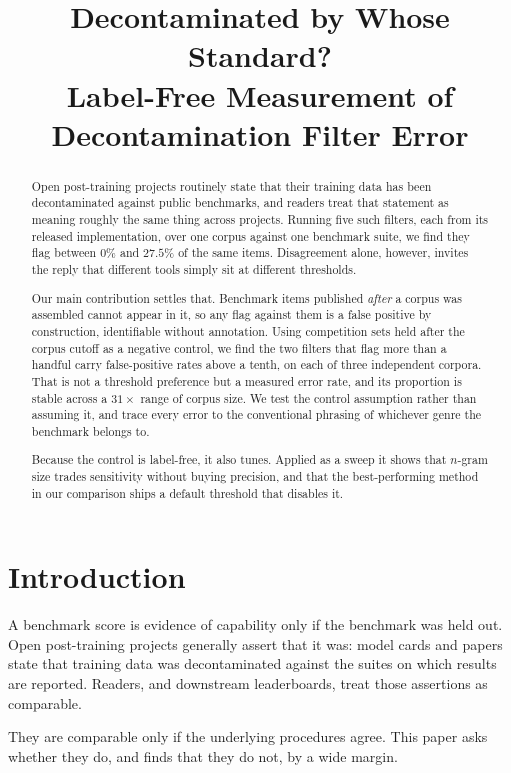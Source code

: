 \documentclass[11pt]{article}
\title{Decontaminated by Whose Standard?\\
Label-Free Measurement of Decontamination Filter Error}
\begin{document}
\maketitle

\begin{abstract}
Open post-training projects routinely state that their training data has been
decontaminated against public benchmarks, and readers treat that statement as
meaning roughly the same thing across projects. Running five such filters, each
from its released implementation, over one corpus against one benchmark suite, we
find they flag between $0\%$ and $27.5\%$ of the same items.
Disagreement alone, however, invites the reply that different tools simply sit at
different thresholds.

Our main contribution settles that. Benchmark items published \emph{after} a
corpus was assembled cannot appear in it, so any flag against them is a false
positive by construction, identifiable without annotation. Using competition sets
held after the corpus cutoff as a negative control, we find the two filters that
flag more than a handful carry false-positive rates above a tenth, on each of
three independent corpora. That is not a threshold preference but a measured error
rate, and its proportion is stable across a $31\times$ range of corpus size. We
test the control assumption rather than assuming it, and trace every error to the
conventional phrasing of whichever genre the benchmark belongs to.

Because the control is label-free, it also tunes. Applied as a sweep it shows that
$n$-gram size trades sensitivity without buying precision, and that the
best-performing method in our comparison ships a default threshold that disables
it.
\end{abstract}

\section{Introduction}

A benchmark score is evidence of capability only if the benchmark was held out.
Open post-training projects generally assert that it was: model cards and papers
state that training data was decontaminated against the suites on which results
are reported. Readers, and downstream leaderboards, treat those assertions as
comparable.

They are comparable only if the underlying procedures agree. This paper asks
whether they do, and finds that they do not, by a wide margin.
\end{document}

